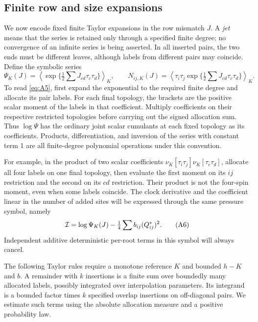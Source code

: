 \subsection{Finite row and size expansions}

We now encode fixed finite Taylor expansions in the row mismatch \(J\).
A \emph{jet} means that the series is retained only through a specified
finite degree; no convergence of an infinite series is being asserted.
In all inserted pairs, the two ends must be different leaves, although
labels from different pairs may coincide. Define the symbolic series
\[
 \Psi_K(J)=\left\langle\exp\{\tfrac12\sum J_{cd}\tau_c\tau_d\}\right\rangle_K,
 \qquad N_{ij,K}(J)=\left\langle\tau_i\tau_j
                \exp\{\tfrac12\sum J_{cd}\tau_c\tau_d\}\right\rangle_K .         \tag{A5}\label{eq:A5}
\]
To read \eqref{eq:A5}, first expand the exponential to the required
finite degree and allocate its pair labels. For each final topology,
the brackets are the positive scalar moment of the labels in that
coefficient. Multiply coefficients on their respective restricted
topologies before carrying out the signed allocation sum. Thus
\(\log\Psi\) has the ordinary joint scalar cumulants at each fixed
topology as its coefficients. Products, differentiation, and inversion
of the series with constant term 1 are all finite-degree polynomial
operations under this convention.

For example, in the product of two
scalar coefficients \(\nu_K[\tau_i\tau_j]\nu_K[\tau_c\tau_d]\), allocate
all four labels on one final topology, then evaluate the first moment
on its \(ij\) restriction and the second on its \(cd\) restriction.
Their product is not the four-spin moment, even when some labels
coincide. The clock derivative and the coefficient linear in the number
of added sites will be expressed through the same pressure symbol,
namely
\[
 {\cal I}=\log\Psi_K(J)-\tfrac14\sum b_{ij}(Q^*_{ij})^2 .
                                                               \tag{A6}\label{eq:A6}
\]
Independent additive deterministic per-root terms in this symbol will always cancel.

The following Taylor rules require a monotone reference \(K\) and
bounded \(h-K\) and \(b\). A remainder with \(k\) insertions is a
finite sum over boundedly many allocated labels, possibly integrated
over interpolation parameters. Its integrand is a bounded factor times
\(k\) specified overlap insertions on off-diagonal pairs. We estimate
such terms using the absolute allocation measure and a positive
probability law.

